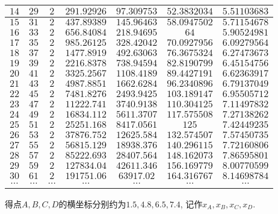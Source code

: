 \documentclass[10pt,a4paper]{article}
\begin{document}
\begin{enumerate}[1.]
\begin{center}
\begin{longtable}{|c|c|c|c|c|c|c|}
        $14$ & $29$ & $2$ & $291.92926$ & $97.309753$ & $52.3832034$ & $5.51103683$\\ \hline
        $15$ & $31$ & $2$ & $437.89389$ & $145.96463$ & $58.0947502$ & $5.71154678$\\ \hline
        $16$ & $33$ & $2$ & $656.84084$ & $218.94695$ & $64$ & $5.90524981$\\ \hline
        $17$ & $35$ & $2$ & $985.26125$ & $328.42042$ & $70.0927956$ & $6.09279564$\\ \hline
        $18$ & $37$ & $2$ & $1477.8919$ & $492.63063$ & $76.3675324$ & $6.27473673$\\ \hline
        $19$ & $39$ & $2$ & $2216.8378$ & $738.94594$ & $82.8190799$ & $6.45154756$\\ \hline
        $20$ & $41$ & $2$ & $3325.2567$ & $1108.4189$ & $89.4427191$ & $6.62363917$\\ \hline
        $21$ & $43$ & $2$ & $4987.8851$ & $1662.6284$ & $96.2340896$ & $6.79137049$\\ \hline
        $22$ & $45$ & $2$ & $7481.8276$ & $2493.9425$ & $103.189147$ & $6.95505712$\\ \hline
        $23$ & $47$ & $2$ & $11222.741$ & $3740.9138$ & $110.304125$ & $7.11497832$\\ \hline
        $24$ & $49$ & $2$ & $16834.112$ & $5611.3707$ & $117.575508$ & $7.27138262$\\ \hline
        $25$ & $51$ & $2$ & $25251.168$ & $8417.0561$ & $125$ & $7.42449235$\\ \hline
        $26$ & $53$ & $2$ & $37876.752$ & $12625.584$ & $132.574507$ & $7.57450735$\\ \hline
        $27$ & $55$ & $2$ & $56815.129$ & $18938.376$ & $140.296115$ & $7.72160806$\\ \hline
        $28$ & $57$ & $2$ & $85222.693$ & $28407.564$ & $148.162073$ & $7.86595801$\\ \hline
        $29$ & $59$ & $2$ & $127834.04$ & $42611.346$ & $156.169779$ & $8.00770599$\\ \hline
        $30$ & $61$ & $2$ & $191751.06$ & $63917.02$ & $164.316767$ & $8.14698784$\\ \hline
        $\cdots$ & $\cdots$ & $\cdots$ & $\cdots$ & $\cdots$ & $\cdots$ & $\cdots$ \\ \hline
    \end{longtable}
\end{center}
得点$A,B,C,D$的横坐标分别约为$1.5,4.8, 6.5, 7.4$, 记作$x_A,x_B,x_C,x_D$.\\

\end{enumerate}
\end{document}
